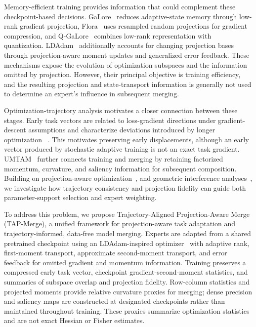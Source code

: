\documentclass[fleqn,10pt]{wlscirep}
\begin{document}
Memory-efficient training provides information that could complement
these checkpoint-based decisions. GaLore~\cite{galore2024} reduces adaptive-state memory
through low-rank gradient projection, Flora~\cite{flora2024} uses
resampled random projections for gradient
compression, and Q-GaLore~\cite{qgalore2025} combines low-rank
representation with quantization. LDAdam~\cite{ldadam2025} additionally
accounts for changing projection bases through projection-aware moment
updates and generalized error feedback. These
mechanisms expose the evolution of optimization subspaces and the
information omitted by projection. However, their principal objective
is training efficiency, and the resulting projection and
state-transport information is generally not used to determine an
expert's influence in subsequent merging.

Optimization-trajectory analysis motivates a closer connection between
these stages. Early task vectors are related to loss-gradient directions under gradient-descent
assumptions and characterize deviations introduced by longer
optimization ~\cite{taskvectorsgradients2026}. This motivates preserving early displacements, although an early vector produced by stochastic adaptive training is not an
exact task gradient. UMTAM~\cite{umtam2026} further connects training and merging by
retaining factorized momentum, curvature, and saliency information for
subsequent composition. Building on projection-aware optimization~\cite{ldadam2025}, and geometric interference analyses~\cite{tsvmerge2025,isotropicmerging2025}, we investigate how trajectory consistency and projection fidelity can guide both parameter-support selection and expert weighting.

To address this problem, we propose Trajectory-Aligned Projection-Aware Merge (TAP-Merge),
a unified framework for projection-aware task adaptation and
trajectory-informed, data-free model merging. Experts are adapted from
a shared pretrained checkpoint using an LDAdam-inspired
optimizer~\cite{ldadam2025} with adaptive rank, first-moment transport,
approximate second-moment transport, and error feedback for omitted
gradient and momentum information. Training preserves a compressed
early task vector, checkpoint gradient-second-moment statistics, and
summaries of subspace overlap and projection fidelity. Row-column
statistics and projected moments provide relative curvature proxies
for merging; dense precision and saliency maps are constructed at
designated checkpoints rather than maintained throughout training.
These proxies summarize optimization statistics and are not exact
Hessian or Fisher estimates.
\end{document}
